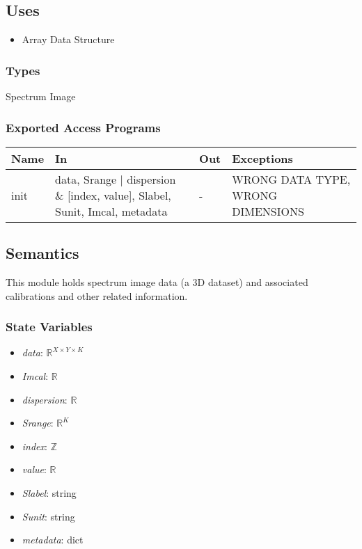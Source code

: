 \documentclass[12pt, titlepage]{article}
\begin{document}
\subsection{Uses}
\begin{itemize}
    \item Array Data Structure
\end{itemize}


\subsubsection{Types}
Spectrum Image

\subsubsection{Exported Access Programs}

\begin{center}
    \begin{tabular}{p{1.5cm} p{4cm} p{4cm} p{4cm}}
        \toprule
        \textbf{Name} & \textbf{In} & \textbf{Out} & \textbf{Exceptions} \\
        \midrule
        init & data, Srange $|$ dispersion $\&$ [index, value], Slabel, Sunit,
        Imcal, metadata & - & WRONG DATA TYPE, WRONG DIMENSIONS \\
        \bottomrule
    \end{tabular}
\end{center}

\subsection{Semantics}
This module holds spectrum image data (a 3D dataset) and associated calibrations
and other related information.

\subsubsection{State Variables}
\begin{itemize}
    \item \textit{data}: $\mathbb{R}^{X \times Y \times K}$
    \item \textit{Imcal}: $\mathbb{R}$
    \item \textit{dispersion}: $\mathbb{R}$
    \item \textit{Srange}: $\mathbb{R}^{K}$
    \item \textit{index}: $\mathbb{Z}$
    \item \textit{value}: $\mathbb{R}$
    \item \textit{Slabel}: string
    \item \textit{Sunit}: string
    \item \textit{metadata}: dict
\end{itemize}
\end{document}
